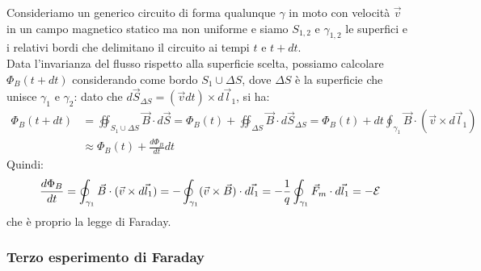 Consideriamo un generico circuito di forma qualunque $ \gamma $ in moto con velocità $ \vec{v} $ in un campo magnetico statico ma non uniforme e siamo $ S_{1,2} $ e $ \gamma_{1,2} $ le superfici e i relativi bordi che delimitano il circuito ai tempi $ t $ e $ t + dt $. \\ 
%
Data l'invarianza del flusso rispetto alla superficie scelta, possiamo calcolare $ \Phi_B(t+dt) $ considerando come bordo $ S_1 \cup \Delta S $, dove $ \Delta S $ è la superficie che unisce $	\gamma_1 $ e $ \gamma_2 $: dato che $ d\vec{S}_{\Delta S} = (\vec{v}dt)\times d\vec{l}_1 $, si ha:
\begin{equation}
	\begin{split}
		\Phi_B(t+dt) &= \oiint_{S_1 \cup \Delta S} \vec{B}\cdot d\vec{S} = \Phi_B(t) + \oiint_{\Delta S} \vec{B}\cdot d\vec{S}_{\Delta S} = \Phi_B(t) + dt \oint_{\gamma_1} \vec{B}\cdot (\vec{v}\times d\vec{l}_1) \\ 
			     &\approx \Phi_B(t) + \frac{d\Phi_B}{dt} dt
	\end{split}
	\label{eq:8}
\end{equation}
Quindi:
\begin{equation}
	\frac{d\Phi_B}{dt} = \oint_{\gamma_1} \vec{B} \cdot (\vec{v}\times d\vec{l}_1) = - \oint_{\gamma_1} (\vec{v}\times\vec{B}) \cdot d\vec{l}_1 = -\frac{1}{q} \oint_{\gamma_1} \vec{F}_m \cdot d\vec{l}_1 = -\mathcal{E}
	\label{eq:9}
\end{equation}
che è proprio la legge di Faraday.

\subsubsection{Terzo esperimento di Faraday}

